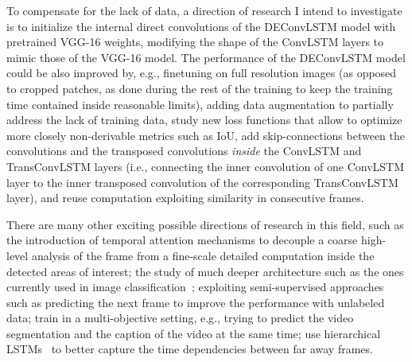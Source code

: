 To compensate for the lack of data, a direction of research I intend to
investigate is to initialize the internal direct convolutions of the DEConvLSTM
model with pretrained VGG-16 weights, modifying the shape of the ConvLSTM
layers to mimic those of the VGG-16 model. The performance of the DEConvLSTM
model could be also improved by, e.g., finetuning on full resolution images (as
opposed to cropped patches, as done during the rest of the training to keep the
training time contained inside reasonable limits), adding data augmentation to
partially address the lack of training data, study new loss functions that
allow to optimize more closely non-derivable metrics such as IoU, add
skip-connections between the convolutions and the transposed convolutions
\emph{inside} the ConvLSTM and TransConvLSTM layers (i.e., connecting the
inner convolution of one ConvLSTM layer to the inner transposed convolution of
the corresponding TransConvLSTM layer), and reuse computation exploiting
similarity in consecutive frames.

There are many other exciting possible directions of research in this field,
such as the introduction of temporal attention mechanisms to decouple a coarse
high-level analysis of the frame from a fine-scale detailed computation inside
the detected areas of interest; the study of much deeper architecture such as
the ones currently used in image classification~\citep[see, e.g.,~][]{
szegedy2016inception,he2015deep}; exploiting semi-supervised approaches such as
predicting the next frame to improve the performance with unlabeled data; train
in a multi-objective setting, e.g., trying to predict the video segmentation
and the caption of the video at the same time; use hierarchical
LSTMs~\citep[see, e.g.,~][]{Koutnik-et-al-ICML2014, chung2016hierarchical} to
better capture the time dependencies between far away frames.
